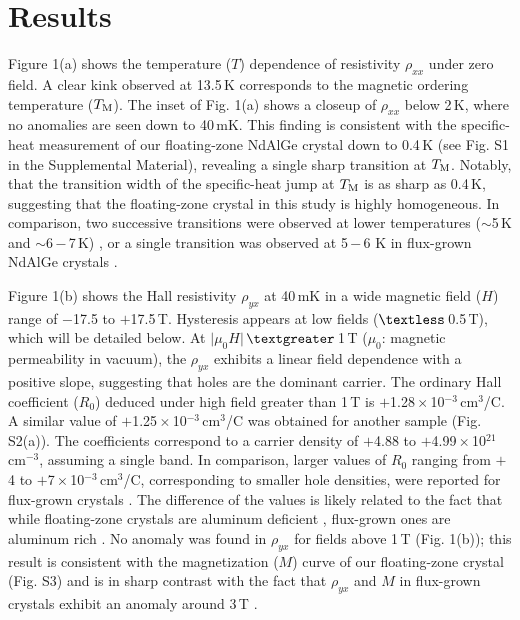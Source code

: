\documentclass[%
preprint,
 amsmath,amssymb,
 aps,
]{revtex4-2}
\begin{document}
\section{Results}

%
Figure 1(a) shows the temperature ($T$) dependence of resistivity $\rho_{xx}$ under zero field. 
%
A clear kink observed at 13.5\,K corresponds to the magnetic ordering temperature ($T_{\rm M}$). 
%
The inset of Fig. 1(a) shows a closeup of $\rho_{xx}$ below 2\,K, 
where no anomalies are seen down to 40\,mK. 
%
This finding is consistent with the specific-heat measurement of our floating-zone NdAlGe crystal 
down to 0.4\,K (see Fig. S1 in the Supplemental Material), 
revealing a single sharp transition at $T_{\rm M}$. 
%
Notably, that the transition width of the specific-heat jump at $T_{\rm M}$ is as sharp as 0.4\,K, 
suggesting that the floating-zone crystal in this study is highly homogeneous. 
%
In comparison, two successive transitions were observed at lower temperatures ($\sim$5\,K and 
$\sim$6\,$-$\,7\,K) 
\cite{Yang_PhysRevMater_2023,Dhital_PhyrevB_2023}, 
or a single transition was observed at 5\,$-$\,6 K in flux-grown NdAlGe crystals 
\cite{Zhao_NewJPhys_2022,Cho_SSRN_2022}. 
%

%
Figure 1(b) shows the Hall resistivity $\rho_{yx}$ at 40\,mK in a wide magnetic field ($H$) 
range of $-$17.5 to $+$17.5\,T.  
%
Hysteresis appears at low fields ($\textless$\,0.5\,T), which will be detailed below. 
%
At $\lvert \mu_{0}H \rvert$\,$\textgreater$\,1\,T ($\mu_{0}$: magnetic permeability in vacuum), 
the $\rho_{yx}$ exhibits a linear field dependence with a positive slope, 
suggesting that holes are the dominant carrier. 
%
The ordinary Hall coefficient ($R_{0}$) deduced under high field greater than 1\,T is 
$+$1.28\,$\times$\,10$^{-3}$\,cm$^{3}$/C. A similar value of $+$1.25\,$\times$\,10$^{-3}$\,cm$^{3}$/C was obtained 
for another sample (Fig. S2(a)). 
%
The coefficients correspond to a carrier density of $+$4.88 to $+$4.99\,$\times$\,10$^{21}$\,cm$^{-3}$, 
assuming a single band. In comparison, 
larger values of $R_{0}$ ranging from $+$4 to $+$7\,$\times$\,10$^{-3}$\,cm$^{3}$/C, 
corresponding to smaller hole densities, 
were reported for flux-grown crystals 
\cite{Yang_PhysRevMater_2023,Cho_SSRN_2022,Dhital_PhyrevB_2023}. 
%
The difference of the values is likely related to the fact that while floating-zone crystals are 
aluminum deficient \cite{Kikugawa_inorganics_2023}, 
flux-grown ones are aluminum rich 
\cite{Zhao_NewJPhys_2022,Yang_PhysRevMater_2023,Cho_SSRN_2022,Dhital_PhyrevB_2023}. 
%
No anomaly was found in $\rho_{yx}$ for fields above 1\,T (Fig. 1(b)); 
this result is consistent with the magnetization ($M$) curve of our floating-zone crystal (Fig. S3) 
and is in sharp contrast with the fact that $\rho_{yx}$ and $M$ in flux-grown crystals exhibit 
an anomaly around 3\,T 
\cite{Zhao_NewJPhys_2022,Yang_PhysRevMater_2023,Cho_SSRN_2022,Dhital_PhyrevB_2023}.  
%
\end{document}
